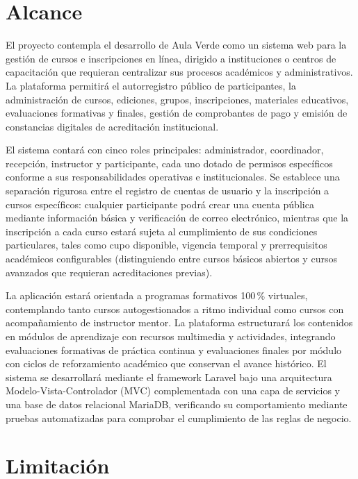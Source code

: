 \section{Alcance}

El proyecto contempla el desarrollo de Aula Verde como un sistema web para la gestión de cursos e inscripciones en línea, dirigido a instituciones o centros de capacitación que requieran centralizar sus procesos académicos y administrativos. La plataforma permitirá el autorregistro público de participantes, la administración de cursos, ediciones, grupos, inscripciones, materiales educativos, evaluaciones formativas y finales, gestión de comprobantes de pago y emisión de constancias digitales de acreditación institucional.

El sistema contará con cinco roles principales: administrador, coordinador, recepción, instructor y participante, cada uno dotado de permisos específicos conforme a sus responsabilidades operativas e institucionales. Se establece una separación rigurosa entre el registro de cuentas de usuario y la inscripción a cursos específicos: cualquier participante podrá crear una cuenta pública mediante información básica y verificación de correo electrónico, mientras que la inscripción a cada curso estará sujeta al cumplimiento de sus condiciones particulares, tales como cupo disponible, vigencia temporal y prerrequisitos académicos configurables (distinguiendo entre cursos básicos abiertos y cursos avanzados que requieran acreditaciones previas).

La aplicación estará orientada a programas formativos 100\,\% virtuales, contemplando tanto cursos autogestionados a ritmo individual como cursos con acompañamiento de instructor mentor. La plataforma estructurará los contenidos en módulos de aprendizaje con recursos multimedia y actividades, integrando evaluaciones formativas de práctica continua y evaluaciones finales por módulo con ciclos de reforzamiento académico que conservan el avance histórico. El sistema se desarrollará mediante el framework Laravel bajo una arquitectura Modelo-Vista-Controlador (MVC) complementada con una capa de servicios y una base de datos relacional MariaDB, verificando su comportamiento mediante pruebas automatizadas para comprobar el cumplimiento de las reglas de negocio.

\section{Limitación}

